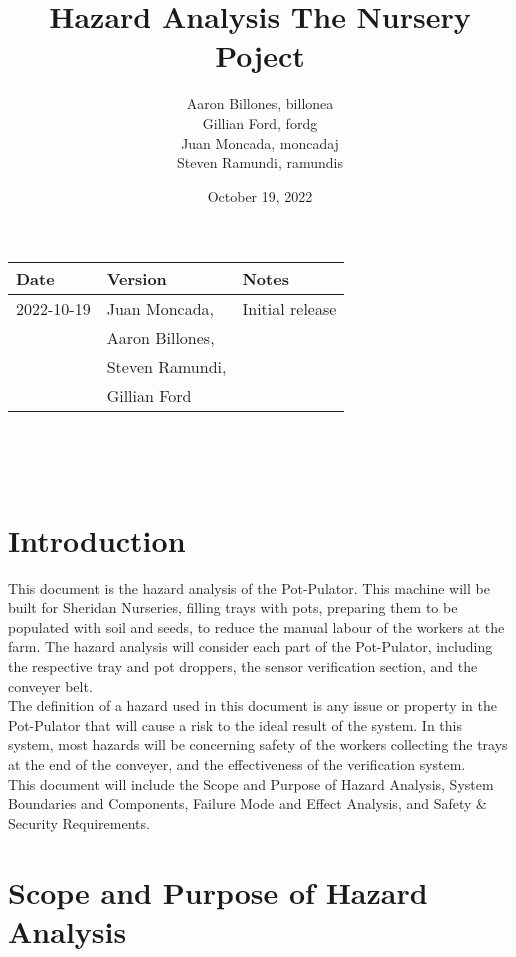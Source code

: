 \documentclass{article}
\title{Hazard Analysis The Nursery Poject}
\author{Aaron Billones, billonea\\Gillian Ford, fordg\\Juan Moncada, moncadaj\\Steven Ramundi, ramundis}
\date{October 19, 2022}
\begin{document}
\maketitle
\thispagestyle{empty}




\begin{tabularx}{\textwidth}{p{3cm}p{4cm}X}
    \toprule {\bf Date} & {\bf Version} & {\bf Notes}\\
    \midrule
    2022-10-19 & Juan Moncada,& Initial release\\&Aaron Billones,\\&Steven Ramundi,\\&Gillian Ford \\
    
    \bottomrule
\end{tabularx}

~\newpage

\tableofcontents

~\newpage


\section{Introduction}

\noindent This document is the hazard analysis of the Pot-Pulator. This machine will be built for Sheridan Nurseries, filling trays with pots, preparing them to be populated with soil and seeds, to reduce the manual labour of the workers at the farm. The hazard analysis will consider each part of the Pot-Pulator, including the respective tray and pot droppers, the sensor verification section, and the conveyer belt. 
\\

\noindent The definition of a hazard used in this document is any issue or property in the Pot-Pulator that will cause a risk to the ideal result of the system. In this system, most hazards will be concerning safety of the workers collecting the trays at the end of the conveyer, and the effectiveness of the verification system. 
\\

\noindent This document will include the Scope and Purpose of Hazard Analysis, System Boundaries and Components, Failure Mode and Effect Analysis, and Safety \& Security Requirements.  

\section{Scope and Purpose of Hazard Analysis}
\end{document}
